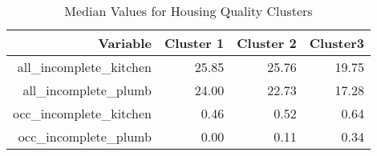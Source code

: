 \begin{table}[ht]
    \centering
    \caption{Median Values for Housing Quality Clusters}
    \label{tab:qual}
    \begin{tabular}{|r|r|r|r|}
      \hline
     Variable & Cluster 1 & Cluster 2 & Cluster3 \\ 
      \hline
    all\_incomplete\_kitchen & 25.85 & 25.76 & 19.75 \\ 
    \hline
      all\_incomplete\_plumb & 24.00 & 22.73 & 17.28 \\ 
    \hline
      occ\_incomplete\_kitchen & 0.46 & 0.52 & 0.64 \\ 
    \hline
      occ\_incomplete\_plumb & 0.00 & 0.11 & 0.34 \\ 
    \hline
    \end{tabular}
    \end{table}